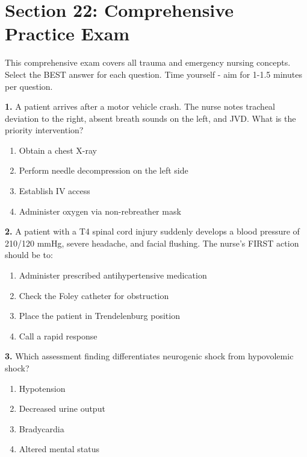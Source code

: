 \documentclass[11pt]{article}
\begin{document}
\newpage
\section*{Section 22: Comprehensive Practice Exam}

\begin{tcolorbox}[colback=gray!10!white,colframe=gray!75!black,title=Practice Exam Instructions]
This comprehensive exam covers all trauma and emergency nursing concepts. Select the BEST answer for each question. Time yourself - aim for 1-1.5 minutes per question.
\end{tcolorbox}

\vspace{0.5cm}

\textbf{1.} A patient arrives after a motor vehicle crash. The nurse notes tracheal deviation to the right, absent breath sounds on the left, and JVD. What is the priority intervention?

\begin{enumerate}[label=\Alph*.]
    \item Obtain a chest X-ray
    \item Perform needle decompression on the left side
    \item Establish IV access
    \item Administer oxygen via non-rebreather mask
\end{enumerate}

\vspace{0.3cm}

\textbf{2.} A patient with a T4 spinal cord injury suddenly develops a blood pressure of 210/120 mmHg, severe headache, and facial flushing. The nurse's FIRST action should be to:

\begin{enumerate}[label=\Alph*.]
    \item Administer prescribed antihypertensive medication
    \item Check the Foley catheter for obstruction
    \item Place the patient in Trendelenburg position
    \item Call a rapid response
\end{enumerate}

\vspace{0.3cm}

\textbf{3.} Which assessment finding differentiates neurogenic shock from hypovolemic shock?

\begin{enumerate}[label=\Alph*.]
    \item Hypotension
    \item Decreased urine output
    \item Bradycardia
    \item Altered mental status
\end{enumerate}
\end{document}
